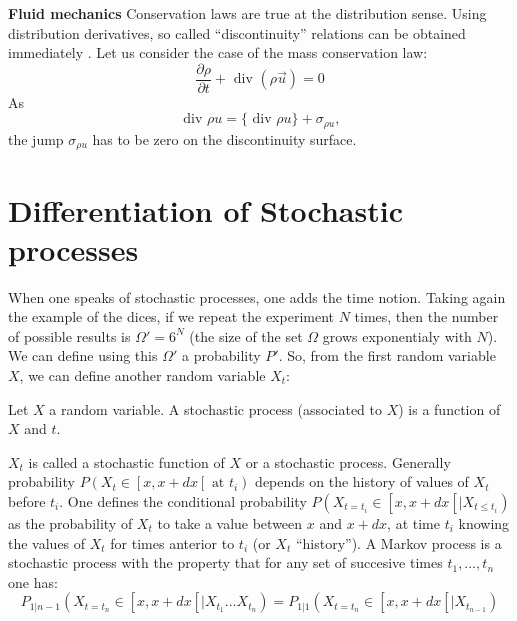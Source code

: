 \documentclass[12pt]{book}
\begin{document}
\begin{exmp}{\bf Fluid mechanics}
Conservation laws are true at the distribution sense. Using distribution
derivatives, so called ``discontinuity'' relations can be obtained immediately
\cite{ph:fluid:Germain80}. Let us consider the case of the mass
conservation law: 
\begin{equation}
\frac{\partial \rho}{\partial t}+\mbox{ div }(\rho \vec{u})=0
\end{equation}
As
\begin{equation}
\mbox{ div } \rho {u}=\{\mbox{ div } \rho {u}\}+\sigma_{\rho u},
\end{equation}
the jump $\sigma_{\rho u}$ has to be zero on the discontinuity surface.
\end{exmp}

\section{Differentiation of Stochastic processes}\label{secstoch}
When one speaks of stochastic
processes\cite{ma:stoch:VanKampen81,ma:stoch:Baxter96}, one
adds the time notion. 
Taking again the example of the dices, if we repeat the experiment $N$
times, then the number of possible results is $\Omega'=6^N$ (the size
of the set $\Omega$ grows exponentialy with $N$).
We can define using this $\Omega'$ a probability $P'$.
So, from the first random variable $X$, we can define another random
variable $X_t$:
\begin{defn}
Let $X$ a random variable. A stochastic process
(associated to $X$) is a 
function of $X$ and $t$.
\end{defn}
 $X_t$ is called a stochastic function of $X$ or a
stochastic process.
Generally probability $P(X_t\in \mathrel{[}x,x+dx\mathrel{[} \mbox{ at  } t_i)$ depends on
the history of values of $X_t$ before $t_i$.
One defines the conditional probability 
$P(X_{t=t_i}\in \mathrel{[}x,x+dx\mathrel{[}|X_{t\leq t_i})$ as the probability of $X_t$ to
take a value between $x$ and $x+dx$, at time $t_i$ knowing the values
of $X_t$ for times anterior to $t_i$ (or $X_t$ ``history'').
A Markov process is a stochastic process with the property that for
any set of succesive times $t_1,\dots,t_n$ one has:
\begin{equation}
P_{1|n-1}(X_{t=t_n}\in \mathrel{[}x,x+dx\mathrel{[}|X_{t_1}\dots X_{t_n})=P_{1|1}(X_{t=t_n}\in \mathrel{[}x,x+dx\mathrel{[}|X_{t_{n-1}})
\end{equation}
\end{document}
